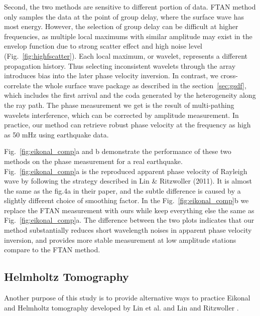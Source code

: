 \documentclass[referee]{gji}
\begin{document}
Second, the two methods are sensitive to different portion of data. FTAN method only samples the data at the point of group delay, where the surface wave has most energy. However, the selection of group delay can be difficult at higher frequencies, as multiple local maximums with similar amplitude may exist in the envelop function due to strong scatter effect and high noise level (Fig.~\ref{fig:highfscatter}). Each local maximum, or wavelet, represents a different propagation history. Thus selecting inconsistent wavelets through the array introduces bias into the later phase velocity inversion. In contrast, we cross-correlate the whole surface wave package as described in the section~\ref{sec:gsdf}, which includes the first arrival and the coda generated by the heterogeneity along the ray path. The phase measurement we get is the result of multi-pathing wavelets interference, which can be corrected by amplitude measurement. In practice, our method can retrieve robust phase velocity at the frequency as high as 50 mHz using earthquake data.

Fig.~\ref{fig:eikonal_comp}a and b demonstrate the performance of these two methods on the phase measurement for a real earthquake. Fig.~\ref{fig:eikonal_comp}a is the reproduced apparent phase velocity of Rayleigh wave by following the strategy described in Lin \& Ritzwoller (2011). It is almost the same as the fig.4a in their paper, and the subtle difference is caused by a slightly different choice of smoothing factor. In the Fig.~\ref{fig:eikonal_comp}b we replace the FTAN measurement with ours while keep everything else the same as Fig.~\ref{fig:eikonal_comp}a. The difference between the two plots indicates that our method substantially reduces short wavelength noises in apparent phase velocity inversion, and provides more stable measurement at low amplitude stations compare to the FTAN method. 


\subsection{Helmholtz Tomography}
\label{sec:helm_dis}

Another purpose of this study is to provide alternative ways to practice Eikonal and Helmholtz tomography developed by Lin et al.  and Lin and Ritzwoller . 
\end{document}
